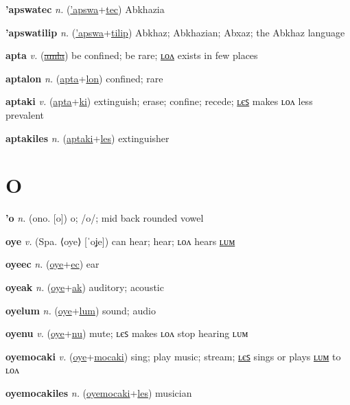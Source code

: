 \textbf{\hypertarget{'apswatec}{'apswatec}} \textit{n.} (\hyperlink{'apswa}{'apswa}+\allowbreak \hyperlink{tec}{tec})
Abkhazia

\textbf{\hypertarget{'apswatilip}{'apswatilip}} \textit{n.} (\hyperlink{'apswa}{'apswa}+\allowbreak \hyperlink{tilip}{tilip})
Abkhaz; Abkhazian; Abxaz; the Abkhaz language

\textbf{\hypertarget{apta}{apta}} \textit{v.} (\hyperlink{amla}{\sout{amla}})
be confined; be rare; \hyperlink{aptalon}{ʟᴏᴧ} exists in few places

\textbf{\hypertarget{aptalon}{aptalon}} \textit{n.} (\hyperlink{apta}{apta}+\allowbreak \hyperlink{lon}{lon})
confined; rare

\textbf{\hypertarget{aptaki}{aptaki}} \textit{v.} (\hyperlink{apta}{apta}+\allowbreak \hyperlink{ki}{ki})
extinguish; erase; confine; recede; \hyperlink{aptakiles}{ʟєꜱ} makes ʟᴏᴧ less prevalent

\textbf{\hypertarget{aptakiles}{aptakiles}} \textit{n.} (\hyperlink{aptaki}{aptaki}+\allowbreak \hyperlink{les}{les})
extinguisher

\section{O}

\textbf{\hypertarget{'o}{'o}} \textit{n.} (ono. [o])
o; /o/; mid back rounded vowel

\textbf{\hypertarget{oye}{oye}} \textit{v.} (Spa. ⟨oye⟩ [ˈoʝe])
can hear; hear; ʟᴏᴧ hears \hyperlink{oyelum}{ʟᴜᴍ}

\textbf{\hypertarget{oyeec}{oyeec}} \textit{n.} (\hyperlink{oye}{oye}+\allowbreak \hyperlink{ec}{ec})
ear

\textbf{\hypertarget{oyeak}{oyeak}} \textit{n.} (\hyperlink{oye}{oye}+\allowbreak \hyperlink{ak}{ak})
auditory; acoustic

\textbf{\hypertarget{oyelum}{oyelum}} \textit{n.} (\hyperlink{oye}{oye}+\allowbreak \hyperlink{lum}{lum})
sound; audio

\textbf{\hypertarget{oyenu}{oyenu}} \textit{v.} (\hyperlink{oye}{oye}+\allowbreak \hyperlink{nu}{nu})
mute; ʟєꜱ makes ʟᴏᴧ stop hearing ʟᴜᴍ

\textbf{\hypertarget{oyemocaki}{oyemocaki}} \textit{v.} (\hyperlink{oye}{oye}+\allowbreak \hyperlink{mocaki}{mocaki})
sing; play music; stream; \hyperlink{oyemocakiles}{ʟєꜱ} sings or plays \hyperlink{oyemocakilum}{ʟᴜᴍ} to ʟᴏᴧ

\textbf{\hypertarget{oyemocakiles}{oyemocakiles}} \textit{n.} (\hyperlink{oyemocaki}{oyemocaki}+\allowbreak \hyperlink{les}{les})
musician

